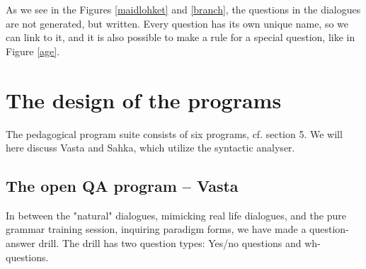 \documentclass[11pt]{article}
\begin{document}
As we see in the Figures \ref{maidlohket} and \ref{branch}, the questions in the dialogues are not generated, but written. Every question has its own unique name, so we can link to it, and it is also possible to make a rule for a special question, like in Figure \ref{age}.  

\section{The design of the programs}
The pedagogical program suite consists of six programs, cf. section 5. We will here discuss Vasta and Sahka, which utilize the syntactic analyser. 






\subsection{The open QA program -- Vasta}	

In between the "natural" dialogues, mimicking real life dialogues, and the pure grammar training session, inquiring paradigm forms, we have made 
a question-answer drill. The drill has two question types: Yes/no questions and wh-questions. 
\end{document}
